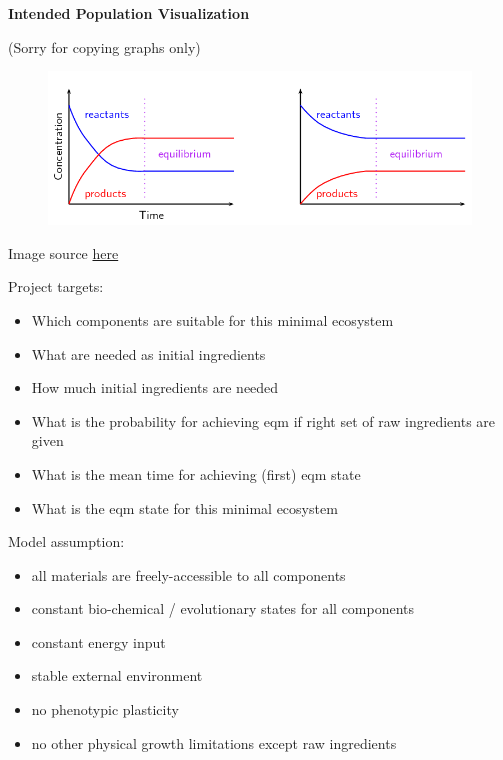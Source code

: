 \documentclass[xcolor=x11names, compress]{beamer}
\begin{document}
	\begin{frame}
		\begin{center}
			\textbf{Intended Population Visualization}
		\end{center}
		(Sorry for copying graphs only)\\
		\begin{figure}[h]
			\centering\includegraphics[width=\linewidth]{eqm_graph.png} %
		\end{figure}
		Image source \href{https://www.siyavula.com/read/science/grade-12/chemical-equilibrium/08-chemical-equilibrium-03}{here}
	\end{frame}

	\begin{frame}
		Project targets:
		\begin{itemize}\itemsep10pt
			\item Which components are suitable for this minimal ecosystem\\
			\item What are needed as initial ingredients\\
			\item How much initial ingredients are needed\\
			\item What is the probability for achieving eqm if right set of raw ingredients are given\\
			\item What is the mean time for achieving (first) eqm state\\
			\item What is the eqm state for this minimal ecosystem
		\end{itemize}
	\end{frame}

	\begin{frame}
		Model assumption:
		\begin{itemize}\itemsep10pt
			\item all materials are freely-accessible to all components\\
			\item constant bio-chemical / evolutionary states for all components\\
			\item constant energy input\\
			\item stable external environment\\
			\item no phenotypic plasticity\\
			\item no other physical growth limitations except raw ingredients
		\end{itemize}
	\end{frame}
\end{document}
